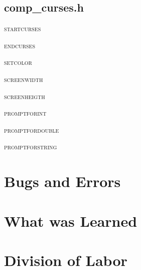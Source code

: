 \documentclass[pdftex, 11pt]{article}
\begin{document}
\subsection{comp\_curses.h}
\begin{description}

	\item{\textsc{startcurses}}

	\item{\textsc{endcurses}}

	\item{\textsc{setcolor}}

	\item{\textsc{screenwidth}}

	\item{\textsc{screenheigth}}

	\item{\textsc{promptforint}}

	\item{\textsc{promptfordouble}}

	\item{\textsc{promptforstring}}

\end{description}

\section{Bugs and Errors}


\section{What was Learned}


\section{Division of Labor}
\end{document}
